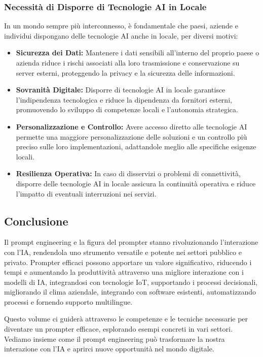         \subsubsection{Necessità di Disporre di Tecnologie AI in Locale}
        In un mondo sempre più interconnesso, è fondamentale che paesi, aziende e individui dispongano delle tecnologie AI anche in locale, per diversi motivi:
        \begin{itemize}
            \item \textbf{Sicurezza dei Dati:} Mantenere i dati sensibili all'interno del proprio paese o azienda riduce i rischi associati alla loro trasmissione e conservazione su server esterni, proteggendo la privacy e la sicurezza delle informazioni.

            \item \textbf{Sovranità Digitale:} Disporre di tecnologie AI in locale garantisce l'indipendenza tecnologica e riduce la dipendenza da fornitori esterni, promuovendo lo sviluppo di competenze locali e l'autonomia strategica.

            \item \textbf{Personalizzazione e Controllo:} Avere accesso diretto alle tecnologie AI permette una maggiore personalizzazione delle soluzioni e un controllo più preciso sulle loro implementazioni, adattandole meglio alle specifiche esigenze locali.

            \item \textbf{Resilienza Operativa:} In caso di disservizi o problemi di connettività, disporre delle tecnologie AI in locale assicura la continuità operativa e riduce l'impatto di eventuali interruzioni nei servizi.
        \end{itemize}
        
    \subsection{Conclusione}
    Il prompt engineering e la figura del prompter stanno rivoluzionando l'interazione con l'IA, rendendola uno strumento versatile e potente nei settori pubblico e privato. Prompter efficaci possono apportare un valore significativo, riducendo i tempi e aumentando la produttività attraverso una migliore interazione con i modelli di IA, integrandosi con tecnologie IoT, supportando i processi decisionali, migliorando il clima aziendale, integrando con software esistenti, automatizzando processi e fornendo supporto multilingue. 

    Questo volume ci guiderà attraverso le competenze e le tecniche necessarie per diventare un prompter efficace, esplorando esempi concreti in vari settori. Vediamo insieme come il prompt engineering può trasformare la nostra interazione con l'IA e aprirci nuove opportunità nel mondo digitale. 
